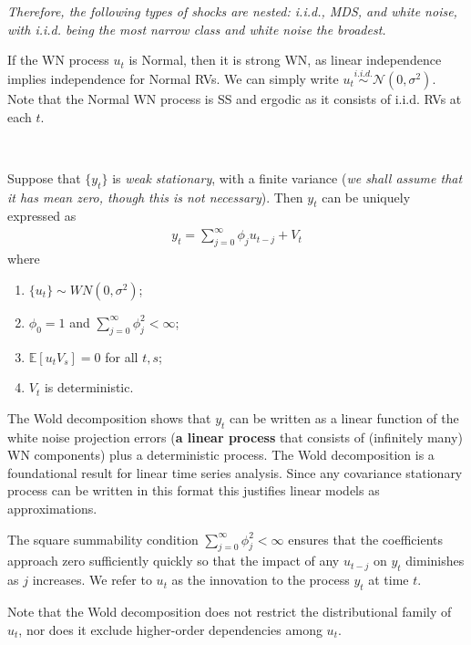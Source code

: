\textit{Therefore, the following types of shocks are nested: i.i.d., MDS, and white noise,
with i.i.d. being the most narrow class and white noise the broadest.}

If the WN process $u_t$ is Normal, then it is strong WN, as linear independence implies independence for Normal RVs.
We can simply write $u_t \overset{i.i.d.}{\sim} \mathcal{N}(0, \sigma^2)$.
Note that the Normal WN process is SS and ergodic as it consists of i.i.d. RVs at each $t$.

\begin{theorem}\label{thm:wolddecomp}
    \

    Suppose that $\{y_t\}$ is \textit{weak stationary}, with a finite variance (\textit{we shall assume that it has mean zero, though this is not necessary}).
    Then $y_t$ can be uniquely expressed as
    \begin{gather*}
        y_t = \sum_{j=0}^{\infty} \phi_j u_{t-j} + V_t 
    \end{gather*}
    where
    \begin{enumerate}
        \item $\{u_t\} \sim WN(0, \sigma^2)$;
        \item $\phi_0 = 1$ and $\sum_{j=0}^{\infty} \phi_j^2 < \infty$;
        \item $\mathbb{E}[u_t V_s] = 0$ for all $t,s$;
        \item $V_t$ is deterministic.
    \end{enumerate}
\end{theorem}   

The Wold decomposition shows that $y_t$ can be written as a linear function of the white noise projection errors (\textbf{a linear process} that consists of (infinitely many) WN components) plus a deterministic process.
The Wold decomposition is a foundational result for linear time series analysis.
Since any covariance stationary process can be written in this format this justifies linear models as approximations.

The square summability condition $\sum_{j=0}^{\infty} \phi_j^2 < \infty$ ensures that the coefficients approach zero sufficiently quickly so that the impact of any $u_{t-j}$ on $y_t$ diminishes as $j$ increases.
We refer to $u_t$ as the innovation to the process $y_t$ at time $t$.

Note that the Wold decomposition does not restrict the distributional
family of $u_t$, nor does it exclude higher-order dependencies among $u_t$.

